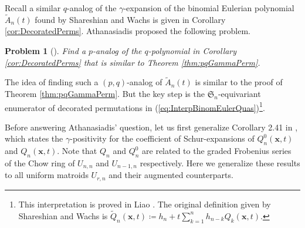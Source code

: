 \documentclass[reqno]{amsart}
\renewcommand{\S}{{\mathfrak{S}}}
\newcommand{\x}{{\mathbf{x}}}
\newtheorem{prob}[thm]{Problem}
\theoremstyle{definition}
\theoremstyle{remark}
\begin{document}
Recall a similar $q$-analog of the $\gamma$-expansion of the binomial Eulerian polynomial $\widetilde{A}_n(t)$ found by Shareshian and Wachs \cite{ShareshianWachs2020} is given in Corollary \ref{cor:DecoratedPerms}. Athanasiadis proposed the following problem.
\begin{prob}[{\cite[Problem 2.5]{AthanasiadisGamma}}]
Find a $p$-analog of the $q$-polynomial in Corollary \ref{cor:DecoratedPerms} that is similar to Theorem \ref{thm:pqGammaPerm}.   
\end{prob}

The idea of finding such a $(p,q)$-analog of $\widetilde{A}_n(t)$ is similar to the proof of Theorem \ref{thm:pqGammaPerm}. 
But the key step is the $\S_n$-equivariant enumerator of decorated permutations in  (\ref{eq:InterpBinomEulerQuas})\footnote{This interpretation is proved in Liao \cite[Theorem 6.21]{Liao2023One}. The original definition given by Shareshian and Wachs \cite{ShareshianWachs2020} is $\widetilde{Q}_n(\x,t)\coloneqq h_n+t\sum_{k=1}^n h_{n-k} Q_k(\x,t)$.}. 



Before answering Athanasiadis' question, let us first generalize Corollary 2.41 in \cite{AthanasiadisGamma}, which states the $\gamma$-positivity for the coefficient of Schur-expansions of $Q_n^0(\x,t)$ and $Q_n(\x,t)$. Note that $Q_n$ and $Q_n^0$ are related to the graded Frobenius series of the Chow ring of $U_{n,n}$ and $U_{n-1,n}$ respectively. Here we generalize these results to all uniform matroids $U_{r,n}$ and their augmented counterparts. 
\end{document}

